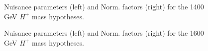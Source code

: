 \begin{figure}[H]
  \centering
  \caption{Nuisance parameters (left) and Norm. factors (right) for the 1400 GeV $H^{+}$ mass hypotheses.}
  \label{fig:Prefit_Hp1400_Blind}
\end{figure}
\begin{figure}[H]
  \centering
  \caption{Nuisance parameters (left) and Norm. factors (right) for the 1600 GeV $H^{+}$ mass hypotheses.}
  \label{fig:Prefit_Hp1600_Blind}
\end{figure}
